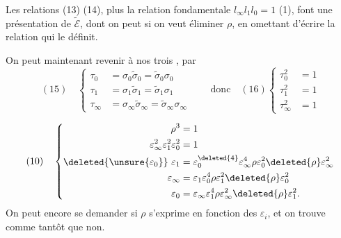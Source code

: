 Les relations (13) (14), plus la relation fondamentale $l_\infty l_1l_0=1$ (1), font une présentation de $\tilde{\mathcal E}$, dont on peut si on veut éliminer $\rho$, en omettant d'écrire la relation qui le définit.

On peut maintenant revenir à nos trois ,  par
\[
(15)\quad\left\{\begin{aligned}
\tau_0&=\sigma_0\tilde\sigma_0=\tilde\sigma_0\sigma_0\\
\tau_1&=\sigma_1\tilde\sigma_1=\tilde\sigma_1\sigma_1\\
\tau_\infty&=\sigma_\infty\tilde\sigma_\infty=\tilde\sigma_\infty\sigma_\infty
\end{aligned}\right.
\qquad\text{donc}\quad(16)\left\{\begin{aligned}
\tau_0^2&=1\\\tau_1^2&=1\\\tau_\infty^2&=1
\end{aligned}\right.
\]

\[
(10)\quad\left\{\begin{aligned}
\rho^3&=1\\
\varepsilon_\infty^2\varepsilon_1^2\varepsilon_0^2&=1\\
\deleted{\unsure{\varepsilon_0}}\ \varepsilon_1&=\varepsilon_0^{\deleted{4}}\varepsilon_\infty^4\rho\varepsilon_0^2\deleted{\rho}\varepsilon_\infty^2\\
\varepsilon_\infty&=\varepsilon_1\varepsilon_0^4\rho\varepsilon_1^2\deleted{\rho}\varepsilon_0^2\\
\varepsilon_0&=\varepsilon_\infty\varepsilon_1^4\rho\varepsilon_\infty^2\deleted{\rho}\varepsilon_1^2.
\end{aligned}\right.
\]
On peut encore se demander si $\rho$ s'exprime en fonction des $\varepsilon_i$, et on trouve comme tantôt que non.


